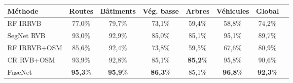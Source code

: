 \begin{table}[t]
    \label{table_potsdam_results}
	\begin{tabularx}{\textwidth}{Y c c c c c c c}
    \toprule
    Méthode                 & Routes     & Bâtiments& Vég. basse  & Arbres   & Véhicules & Global\\
    \midrule
    RF \gls{IRRVB}          & 77,0\%    & 79,7\%  & 73,1\%      & 59,4\%  & 58,8\%   & 74,2\%\\
    SegNet \gls{RVB}        & 93,0\%    &	92,9\%	&	85,0\%      &	85,1\%  &	95,1\%	 & 89,7\%\\
    \midrule
    RF \gls{IRRVB}+\gls{OSM}& 85,6\%    & 92,4\%  & 73,8\%      & 59,5\%  & 67,6\%   & 80,9\%\\
    CR \gls{RVB}+\gls{OSM}  &	93,9\%    &	92,8\%	&	85,1\%		  &	\textbf{85,2}\%    &	95,8\%	&	90,6\%\\
    FuseNet                 &	\textbf{95,3}\%	&	\textbf{95,9}\%	&	\textbf{86,3}\%	   &	85,1\%	&	\textbf{96,8}\%	&	\textbf{92,3}\%\\
    \bottomrule
    \end{tabularx}
\end{table}


